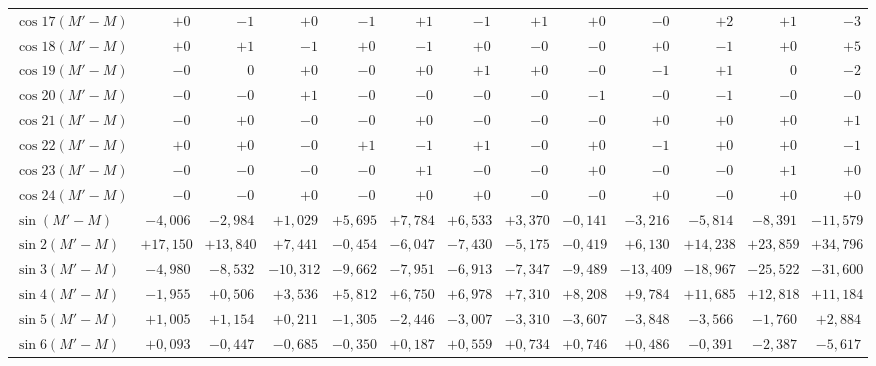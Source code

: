 \begin{landscape}
\begin{longtable}{@{}l|r|r|r|r|r|r|r|r|r|r|r|r@{}}
\(\cos 17(M'-M)\) & \(+0\) & \(-1\) & \(+0\) & \(-1\) & \(+1\) & \(-1\) & \(+1\) & \(+0\) & \(-0\) & \(+2\) & \(+1\) & \(-3\)\\
\(\cos 18(M'-M)\) & \(+0\) & \(+1\) & \(-1\) & \(+0\) & \(-1\) & \(+0\) & \(-0\) & \(-0\) & \(+0\) & \(-1\) & \(+0\) & \(+5\)\\
\(\cos 19(M'-M)\) & \(-0\) & \(0\) & \(+0\) & \(-0\) & \(+0\) & \(+1\) & \(+0\) & \(-0\) & \(-1\) & \(+1\) & \(0\) & \(-2\)\\
\(\cos 20(M'-M)\) & \(-0\) & \(-0\) & \(+1\) & \(-0\) & \(-0\) & \(-0\) & \(-0\) & \(-1\) & \(-0\) & \(-1\) & \(-0\) & \(-0\)\\
\(\cos 21(M'-M)\) & \(-0\) & \(+0\) & \(-0\) & \(-0\) & \(+0\) & \(-0\) & \(-0\) & \(-0\) & \(+0\) & \(+0\) & \(+0\) & \(+1\)\\
\(\cos 22(M'-M)\) & \(+0\) & \(+0\) & \(-0\) & \(+1\) & \(-1\) & \(+1\) & \(-0\) & \(+0\) & \(-1\) & \(+0\) & \(+0\) & \(-1\)\\
\(\cos 23(M'-M)\) & \(-0\) & \(-0\) & \(-0\) & \(-0\) & \(+1\) & \(-0\) & \(-0\) & \(+0\) & \(-0\) & \(-0\) & \(+1\) & \(+0\)\\
\(\cos 24(M'-M)\) & \(-0\) & \(-0\) & \(+0\) & \(-0\) & \(+0\) & \(+0\) & \(-0\) & \(-0\) & \(+0\) & \(-0\) & \(+0\) & \(+0\)\\[6pt]
\(\sin(M'-M)\) & \(-4{,}006\) & \(-2{,}984\) & \(+1{,}029\) & \(+5{,}695\) & \(+7{,}784\) & \(+6{,}533\) & \(+3{,}370\) & \(-0{,}141\) & \(-3{,}216\) & \(-5{,}814\) & \(-8{,}391\) & \(-11{,}579\)\\
\(\sin 2(M'-M)\) & \(+17{,}150\) & \(+13{,}840\) & \(+7{,}441\) & \(-0{,}454\) & \(-6{,}047\) & \(-7{,}430\) & \(-5{,}175\) & \(-0{,}419\) & \(+6{,}130\) & \(+14{,}238\) & \(+23{,}859\) & \(+34{,}796\)\\
\(\sin 3(M'-M)\) & \(-4{,}980\) & \(-8{,}532\) & \(-10{,}312\) & \(-9{,}662\) & \(-7{,}951\) & \(-6{,}913\) & \(-7{,}347\) & \(-9{,}489\) & \(-13{,}409\) & \(-18{,}967\) & \(-25{,}522\) & \(-31{,}600\)\\
\(\sin 4(M'-M)\) & \(-1{,}955\) & \(+0{,}506\) & \(+3{,}536\) & \(+5{,}812\) & \(+6{,}750\) & \(+6{,}978\) & \(+7{,}310\) & \(+8{,}208\) & \(+9{,}784\) & \(+11{,}685\) & \(+12{,}818\) & \(+11{,}184\)\\
\(\sin 5(M'-M)\) & \(+1{,}005\) & \(+1{,}154\) & \(+0{,}211\) & \(-1{,}305\) & \(-2{,}446\) & \(-3{,}007\) & \(-3{,}310\) & \(-3{,}607\) & \(-3{,}848\) & \(-3{,}566\) & \(-1{,}760\) & \(+2{,}884\)\\
\(\sin 6(M'-M)\) & \(+0{,}093\) & \(-0{,}447\) & \(-0{,}685\) & \(-0{,}350\) & \(+0{,}187\) & \(+0{,}559\) & \(+0{,}734\) & \(+0{,}746\) & \(+0{,}486\) & \(-0{,}391\) & \(-2{,}387\) & \(-5{,}617\)\\

\end{longtable}
\end{landscape}

